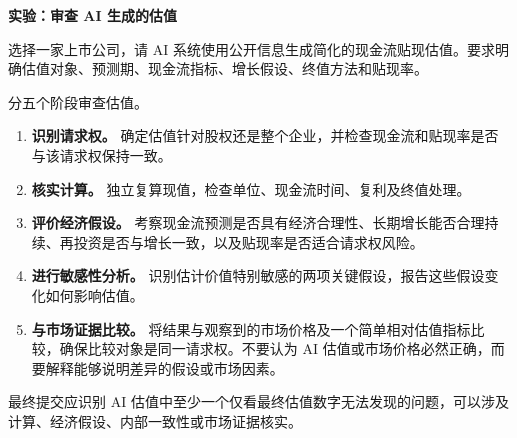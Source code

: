 


\textbf{实验：审查 AI 生成的估值}

选择一家上市公司，请 AI 系统使用公开信息生成简化的现金流贴现估值。要求明确估值对象、预测期、现金流指标、增长假设、终值方法和贴现率。

分五个阶段审查估值。

\begin{enumerate}

\item \textbf{识别请求权。}
确定估值针对股权还是整个企业，并检查现金流和贴现率是否与该请求权保持一致。

\item \textbf{核实计算。}
独立复算现值，检查单位、现金流时间、复利及终值处理。

\item \textbf{评价经济假设。}
考察现金流预测是否具有经济合理性、长期增长能否合理持续、再投资是否与增长一致，以及贴现率是否适合请求权风险。

\item \textbf{进行敏感性分析。}
识别估计价值特别敏感的两项关键假设，报告这些假设变化如何影响估值。

\item \textbf{与市场证据比较。}
将结果与观察到的市场价格及一个简单相对估值指标比较，确保比较对象是同一请求权。不要认为 AI 估值或市场价格必然正确，而要解释能够说明差异的假设或市场因素。

\end{enumerate}

最终提交应识别 AI 估值中至少一个仅看最终估值数字无法发现的问题，可以涉及计算、经济假设、内部一致性或市场证据核实。



